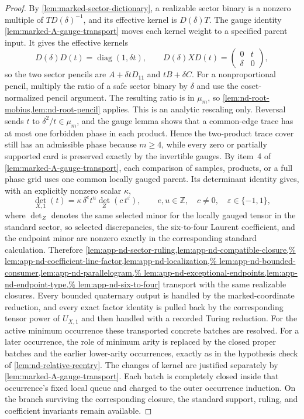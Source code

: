 \documentclass[11pt,letterpaper,onecolumn]{article}
\theoremstyle{plain}
\theoremstyle{definition}
\theoremstyle{remark}
\newcommand{\diag}{\operatorname{diag}}
\begin{document}
\begin{proof}
By \cref{lem:marked-sector-dictionary}, a realizable sector binary is a
nonzero multiple of \(TD(\delta)^{-1}\), and its effective kernel is
\(D(\delta) T\).
The gauge identity \cref{lem:marked-A-gauge-transport} moves each kernel
weight to a specified parent input.  It gives the effective kernels
\hypertarget{eq:marked-A-effective-kernels}{}
\begin{equation*}
 D(\delta) D(t)=\diag(1,\delta t),
 \qquad
 D(\delta) XD(t)=\begin{pmatrix}0&t\\ \delta&0\end{pmatrix},
\end{equation*}
so the two sector pencils are \(A+\delta tD_{11}\) and \(tB+\delta C\).  For a
nonproportional pencil, multiply the ratio of a safe sector binary by \(\delta\) and use the
  coset-normalized pencil argument. The resulting ratio is in
\(\mu_m\), so \cref{lem:nd-root-mobius,lem:nd-root-pencil} applies.  This is
an analytic rescaling only.  Reversal sends \(t\) to
\(\delta^2/t\in \mu_m\), and the gauge lemma shows that a common-edge trace
has at most one forbidden phase in each product.  Hence the two-product
trace cover still has an admissible phase because \(m\ge4\), while every
zero or partially supported card is preserved exactly by the invertible gauges.
By item~4 of \cref{lem:marked-A-gauge-transport}, each comparison of
samples, products, or a full phase grid uses one common locally gauged
parent. Its determinant identity gives, with an explicitly nonzero
scalar \(\kappa\),
\[
 \det_{X,1}(t)
   =\kappa\,\delta^e t^u
      \det_{Z}(c\,t^{\varepsilon}),
\qquad e,u\in\mathbb Z,\quad c\ne0,\quad\varepsilon\in\{-1,1\},
\]
where \(\det_{Z}\) denotes the same selected minor for the
locally gauged tensor in the standard sector,
so selected discrepancies, the six-to-four Laurent coefficient, and the
endpoint minor are nonzero exactly in the corresponding standard
calculation.  Therefore
\cref{lem:app-nd-sector-ruling,lem:app-nd-compatible-closure,%
lem:app-nd-coefficient-line-factor,lem:app-nd-localization,%
lem:app-nd-bounded-consumer,lem:app-nd-parallelogram,%
lem:app-nd-exceptional-endpoints,lem:app-nd-endpoint-type,%
lem:app-nd-six-to-four}
transport with the same realizable closures.  Every bounded quaternary output
is handled by the marked-coordinate reduction,
and every exact factor identity is pulled
back by the corresponding tensor power of \(U_{X,1}\) and
then handled with a recorded Turing reduction.  For the active minimum
occurrence these transported concrete batches are resolved.  For a later
occurrence, the role of minimum arity is replaced by the closed proper
batches and the earlier lower-arity occurrences, exactly as in the
hypothesis check of \cref{lem:nd-relative-reentry}. The changes of kernel
are justified separately by \cref{lem:marked-A-gauge-transport}.
Each batch is completely closed inside that occurrence's fixed local
queue and charged to the outer occurrence induction.  On the branch
surviving the corresponding closure, the standard support, ruling, and
coefficient invariants remain available.


\end{proof}
\end{document}
